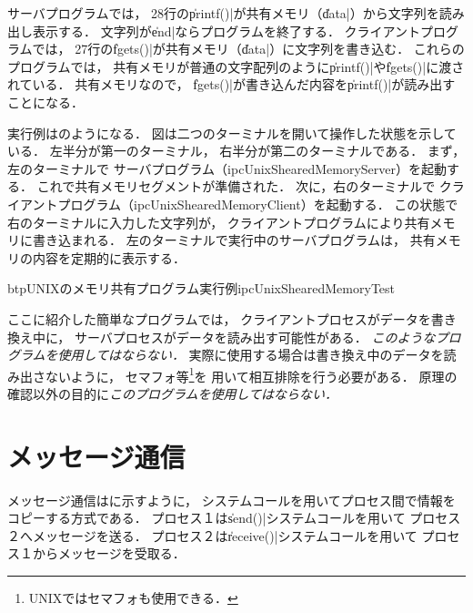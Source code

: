 



サーバプログラムでは，
28行の\|printf()|が共有メモリ（\|data|）から文字列を読み出し表示する．
文字列が\|end|ならプログラムを終了する．
クライアントプログラムでは，
27行の\|fgets()|が共有メモリ（\|data|）に文字列を書き込む．
これらのプログラムでは，
共有メモリが普通の文字配列のように\|printf()|や\|fgets()|に渡されている．
共有メモリなので，
\|fgets()|が書き込んだ内容を\|printf()|が読み出すことになる．

実行例はのようになる．
図は二つのターミナルを開いて操作した状態を示している．
左半分が第一のターミナル，
右半分が第二のターミナルである．
まず，左のターミナルで
サーバプログラム（ipcUnixShearedMemoryServer）を起動する．
これで共有メモリセグメントが準備された．
次に，右のターミナルで
クライアントプログラム（ipcUnixShearedMemoryClient）を起動する．
この状態で右のターミナルに入力した文字列が，
クライアントプログラムにより共有メモリに書き込まれる．
左のターミナルで実行中のサーバプログラムは，
共有メモリの内容を定期的に表示する．

\begin{myfig}{btp}{UNIXのメモリ共有プログラム実行例}{ipcUnixShearedMemoryTest}
  
\end{myfig}

ここに紹介した簡単なプログラムでは，
クライアントプロセスがデータを書き換え中に，
サーバプロセスがデータを読み出す可能性がある．
\emph{このようなプログラムを使用してはならない．}
実際に使用する場合は書き換え中のデータを読み出さないように，
セマフォ等\footnote{UNIXではセマフォも使用できる．}を
用いて相互排除を行う必要がある．
原理の確認以外の目的に\emph{このプログラムを使用してはならない．}

\section{メッセージ通信}
メッセージ通信はに示すように，
システムコールを用いてプロセス間で情報をコピーする方式である．
プロセス１は\|send()|システムコールを用いて
プロセス２へメッセージを送る．
プロセス２は\|receive()|システムコールを用いて
プロセス１からメッセージを受取る．

